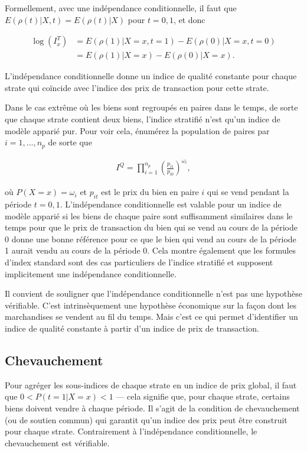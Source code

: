 \documentclass[]{article}
\begin{document}
Formellement, avec une indépendance conditionnelle, il faut que \(E(\rho(t) | X, t) = E(\rho(t) | X)\) pour \(t = 0,1\), et donc

\begin{align*}
\log (I^{T}_{x}) &= E(\rho(1) | X = x, t = 1) - E(\rho(0) | X = x, t = 0) \\
 &= E(\rho(1) | X = x) - E(\rho(0) | X = x).
\end{align*}

L'indépendance conditionnelle donne un indice de qualité constante pour chaque strate qui coïncide avec l'indice des prix de transaction pour cette strate.

Dans le cas extrême où les biens sont regroupés en paires dans le temps, de sorte que chaque strate contient deux biens, l'indice stratifié n'est qu'un indice de modèle apparié pur. Pour voir cela, énumérez la population de paires par \(i = 1, \ldots, n_{p}\) de sorte que

\begin{align*}
I^{Q} = \prod_{i = 1}^{n_{p}} \left(\frac{p_{i1}}{p_{i0}} \right)^{\omega_{i}},
\end{align*}

où \(P(X = x) = \omega_{i}\) et \(p_{it}\) est le prix du bien en paire \(i\) qui se vend pendant la période \(t = 0,1\). L'indépendance conditionnelle est valable pour un indice de modèle apparié si les biens de chaque paire sont suffisamment similaires dans le temps pour que le prix de transaction du bien qui se vend au cours de la période 0 donne une bonne référence pour ce que le bien qui vend au cours de la période 1 aurait vendu au cours de la période 0. Cela montre également que les formules d'index standard sont des cas particuliers de l'indice stratifié et supposent implicitement une indépendance conditionnelle.

Il convient de souligner que l'indépendance conditionnelle n'est pas une hypothèse vérifiable. C'est intrinsèquement une hypothèse économique sur la façon dont les marchandises se vendent au fil du temps. Mais c'est ce qui permet d'identifier un indice de qualité constante à partir d'un indice de prix de transaction.

\hypertarget{chevauchement}{%
\subsection{Chevauchement}\label{chevauchement}}

Pour agréger les sous-indices de chaque strate en un indice de prix global, il faut que \(0 <P (t = 1 | X = x) <1\) --- cela signifie que, pour chaque strate, certains biens doivent vendre à chaque période. Il s'agit de la condition de chevauchement (ou de soutien commun) qui garantit qu'un indice des prix peut être construit pour chaque strate. Contrairement à l'indépendance conditionnelle, le chevauchement est vérifiable.
\end{document}
